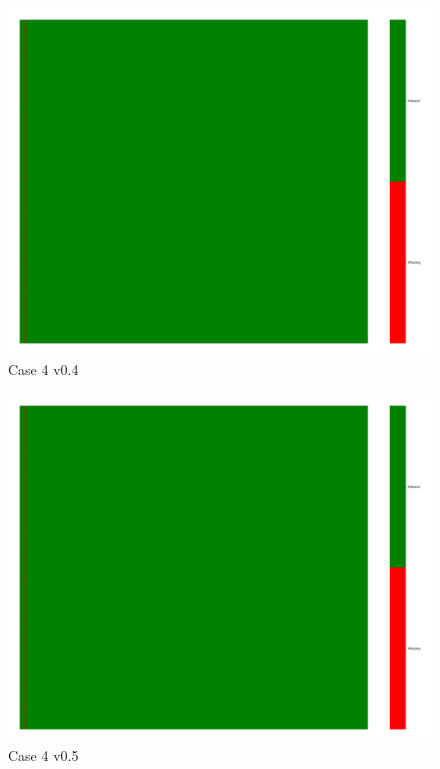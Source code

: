\documentclass[a4paper,12pt]{article}
\begin{document}
\begin{figure}[H]
    \includegraphics[width=\linewidth]{case4_v0.4_heatmap_cleaned.png}
    \caption*{Case 4 v0.4}
\end{figure}

\begin{figure}[H]
    \includegraphics[width=\linewidth]{case4_v0.5_heatmap_cleaned.png}
    \caption*{Case 4 v0.5}
\end{figure}
\end{document}
